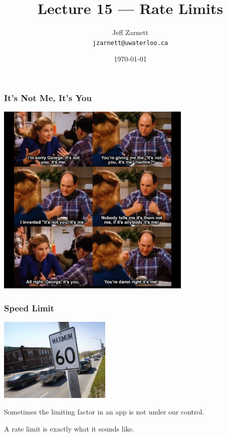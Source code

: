 


\title{Lecture 15 --- Rate Limits}

\author{Jeff Zarnett\\ \small \texttt{jzarnett@uwaterloo.ca}}
\date{\today}




\begin{frame}
  \titlepage
 \end{frame}
 
\begin{frame}
\frametitle{It's Not Me, It's You}

\begin{center}
  \includegraphics[width=0.7\textwidth]{images/its-me.jpg}
\end{center}

\end{frame}

\begin{frame}
\frametitle{Speed Limit}

\begin{center}
  \includegraphics[width=0.4\textwidth]{images/speedlimit.jpg}
\end{center}

Sometimes the limiting factor in an app is not under our control.

A rate limit is exactly what it sounds like.

\end{frame}

